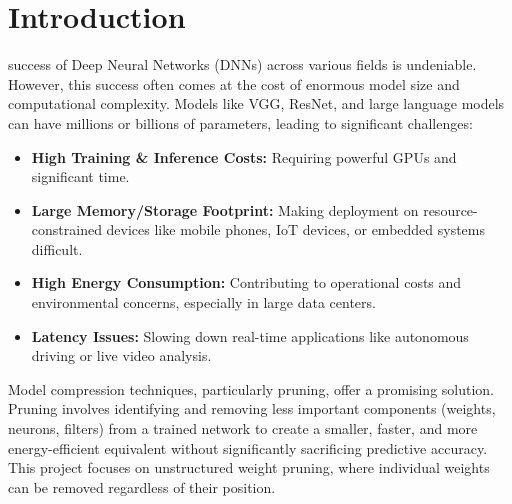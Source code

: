 \documentclass[conference]{IEEEtran} %
\begin{document}
\IEEEpeerreviewmaketitle %

\section{Introduction}
 success of Deep Neural Networks (DNNs) across various fields is undeniable. However, this success often comes at the cost of enormous model size and computational complexity. Models like VGG, ResNet, and large language models can have millions or billions of parameters, leading to significant challenges:
\begin{itemize}
    \item \textbf{High Training \& Inference Costs:} Requiring powerful GPUs and significant time.
    \item \textbf{Large Memory/Storage Footprint:} Making deployment on resource-constrained devices like mobile phones, IoT devices, or embedded systems difficult.
    \item \textbf{High Energy Consumption:} Contributing to operational costs and environmental concerns, especially in large data centers.
    \item \textbf{Latency Issues:} Slowing down real-time applications like autonomous driving or live video analysis.
\end{itemize}
Model compression techniques, particularly pruning, offer a promising solution. Pruning involves identifying and removing less important components (weights, neurons, filters) from a trained network to create a smaller, faster, and more energy-efficient equivalent without significantly sacrificing predictive accuracy. This project focuses on unstructured weight pruning, where individual weights can be removed regardless of their position. 
\end{document}
